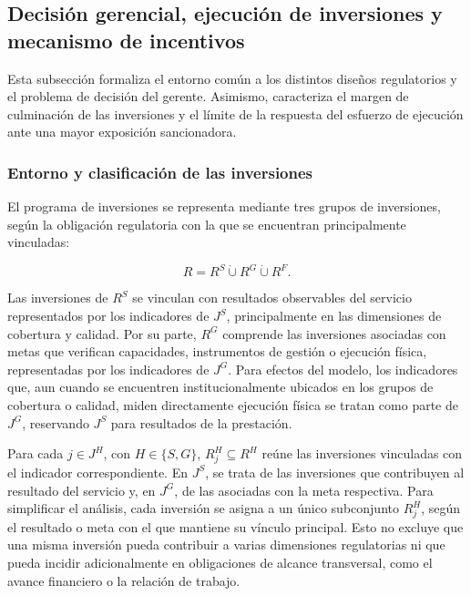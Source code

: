 \subsection{Decisión gerencial, ejecución de inversiones y mecanismo de incentivos}

Esta subsección formaliza el entorno común a los distintos diseños regulatorios y el problema de decisión del gerente. Asimismo, caracteriza el margen de culminación de las inversiones y el límite de la respuesta del esfuerzo de ejecución ante una mayor exposición sancionadora.

\subsubsection{Entorno y clasificación de las inversiones}

El programa de inversiones se representa mediante tres grupos de inversiones, según la obligación regulatoria con la que se encuentran principalmente vinculadas:

\begin{equation}
\label{eq:particion_inversiones}
R
=
R^{S}
\mathbin{\dot\cup}
R^{G}
\mathbin{\dot\cup}
R^{F}.
\end{equation}

Las inversiones de \(R^{S}\) se vinculan con resultados observables del servicio representados por los indicadores de \(J^{S}\), principalmente en las dimensiones de cobertura y calidad. Por su parte, \(R^{G}\) comprende las inversiones asociadas con metas que verifican capacidades, instrumentos de gestión o ejecución física, representadas por los indicadores de \(J^{G}\). Para efectos del modelo, los indicadores que, aun cuando se encuentren institucionalmente ubicados en los grupos de cobertura o calidad, miden directamente ejecución física se tratan como parte de \(J^{G}\), reservando \(J^{S}\) para resultados de la prestación.

Para cada \(j\in J^{H}\), con \(H\in\{S,G\}\), \(R_j^{H}\subseteq R^{H}\) reúne las inversiones vinculadas con el indicador correspondiente. En \(J^{S}\), se trata de las inversiones que contribuyen al resultado del servicio y, en \(J^{G}\), de las asociadas con la meta respectiva. Para simplificar el análisis, cada inversión se asigna a un único subconjunto \(R_j^{H}\), según el resultado o meta con el que mantiene su vínculo principal. Esto no excluye que una misma inversión pueda contribuir a varias dimensiones regulatorias ni que pueda incidir adicionalmente en obligaciones de alcance transversal, como el avance financiero o la relación de trabajo.

